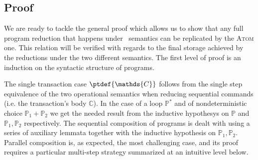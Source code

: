 \tocless\subsection{Proof}

We are ready to tackle the general proof which allows us to show that any full program reduction that happens under \tpl\ semantics can be replicated by the \textsc{Atom} one. This relation will be verified with regards to the final storage achieved by the reductions under the two different semantics. The first level of proof is an induction on the syntactic structure of programs.

The single transaction case $\ptdef{\mathds{C}}$ follows from the single step equivalence of the two operational semantics when reducing sequential commands (i.e. the transaction's body $\mathds{C}$). In the case of a loop $\mathds{P}^*$ and of nondeterministic choice $\mathds{P}_1 + \mathds{P}_2$ we get the needed result from the inductive hypothesys on $\mathds{P}$ and $\mathds{P}_1, \mathds{P}_2$ respectively. The sequential composition of programs is dealt with using a series of auxiliary lemmata together with the inductive hypothesis on $\mathds{P}_1, \mathds{P}_2$. Parallel composition is, as expected, the most challenging case, and its proof requires a particular multi-step strategy summarized at an intuitive level below.
